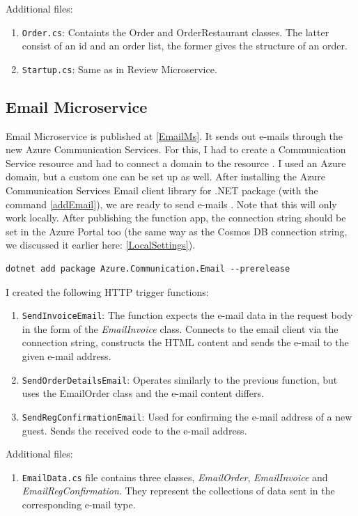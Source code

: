 Additional files: 

\begin{enumerate}
	\item \verb+Order.cs+: Containts the Order and OrderRestaurant classes. The latter consist of an id and an order list, the former gives the structure of an order.
	
	\item \verb+Startup.cs+: Same as in Review Microservice.
\end{enumerate}

\subsection{Email Microservice}\label{EmailMicroservice}

Email Microservice is published at \ref{EmailMs}. It sends out e-mails through the new Azure Communication Services. For this, I had to create a Communication Service resource \cite{CommunicationResource} and had to connect a domain to the resource \cite{ConnectEmailDomain}. I used an Azure domain, but a custom one can be set up as well. After installing the Azure Communication Services Email client library for .NET package (with the command \ref{addEmail}), we are ready to send e-mails \cite{SendEmail}. Note that this will only work locally. After publishing the function app, the connection string should be set in the Azure Portal too (the same way as the Cosmos DB connection string, we discussed it earlier here: \ref{LocalSettings}). 

\lstset{ breaklines=true }
\begin{lstlisting}[frame=single,float=!ht, caption=Adding the e-mail package to a Function App, label=addEmail]
	dotnet add package Azure.Communication.Email --prerelease 
\end{lstlisting}

 I created the following HTTP trigger functions:

\begin{enumerate}
	\item \verb+SendInvoiceEmail+: The function expects the e-mail data in the request body in the form of the \emph{EmailInvoice} class. Connects to the email client via the connection string, constructs the HTML content and sends the e-mail to the given e-mail address.
	
	\item \verb+SendOrderDetailsEmail+: Operates similarly to the previous function, but uses the EmailOrder class and the e-mail content differs.
	
	\item \verb+SendRegConfirmationEmail+: Used for confirming the e-mail address of a new guest. Sends the received code to the e-mail address.
\end{enumerate}

Additional files: 

\begin{enumerate}
	\item \verb+EmailData.cs+ file contains three classes, \emph{EmailOrder}, \emph{EmailInvoice} and \emph{EmailRegConfirmation}. They represent the collections of data sent in the corresponding e-mail type.
\end{enumerate}